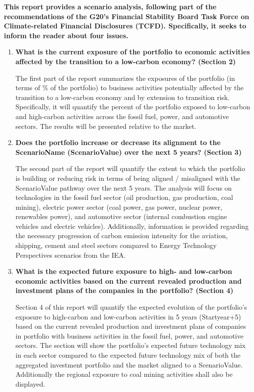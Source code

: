 \documentclass[10pt,table,a4]{article}\usepackage[]{graphicx}\usepackage[]{color}
\begin{document}
	\begin{multicols}{2}
		
		\textbf{This report provides a scenario analysis, following part of the recommendations of the G20's Financial Stability Board Task Force on Climate-related Financial Disclosures (TCFD). Specifically, it seeks to inform the reader about four issues.}
		
		\begin{enumerate}
			\item{\textbf{What is the current exposure of the portfolio to economic activities affected by the transition to a low-carbon economy? (Section 2) }
			}
			
			The first part of the report summarizes the exposures of the portfolio (in terms of \% of the portfolio) to business activities potentially affected by the transition to a low-carbon economy and by extension to transition risk. Specifically, it will quantify the percent of the portfolio exposed to low-carbon and high-carbon activities across the fossil fuel, power, and automotive sectors. The results will be presented relative to the market.
			
			\item{\textbf{Does the portfolio increase or decrease its alignment to the ScenarioName (ScenarioValue) over the next 5 years? (Section 3)}
			}
			
			The second part of the report will quantify the extent to which the portfolio is building or reducing risk in terms of being aligned / misaligned with the ScenarioValue pathway over the next 5 years. The analysis will focus on technologies in the fossil fuel sector (oil production, gas production, coal mining), electric power sector (coal power, gas power, nuclear power, renewables power), and automotive sector (internal combustion engine vehicles and electric vehicles). Additionally, information is provided regarding the necessary progression of carbon emission intensity for the aviation, shipping, cement and steel sectors compared to Energy Technology Perspectives scenarios from the IEA. 
			
			\item{\textbf{What is the expected future exposure to high- and low-carbon economic activities based on the current revealed production and investment plans of the companies in the portfolio? (Section 4)}
			}
			
			Section 4 of this report will quantify the expected evolution of the portfolio's exposure to high-carbon and low-carbon activities in 5 years (Startyear+5) based on the current revealed production and investment plans of companies in portfolio with business activities in the fossil fuel, power, and automotive sectors. The section will show the portfolio's expected future technology mix in each sector compared to the expected future technology mix of both the aggregated investment portfolio and the market aligned to a ScenarioValue. Additionally the regional exposure to coal mining activities shall also be displayed. 
			

\end{enumerate}
\end{multicols}
\end{document}
